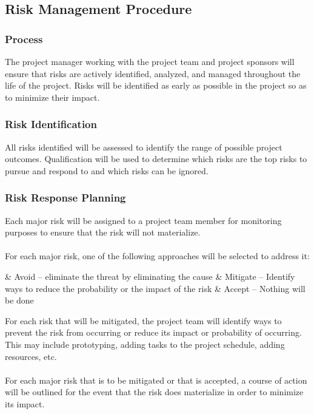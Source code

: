 \documentclass[a4paper]{article}
\begin{document}
    \subsection{Risk Management Procedure}
    
    \subsubsection{Process}
    The project manager working with the project team and project sponsors will ensure that risks are actively identified, analyzed, and managed throughout the life of the project.  Risks will be identified as early as possible in the project so as to minimize their impact. 
    
    \subsubsection{Risk Identification}
    All risks identified will be assessed to identify the range of possible project outcomes.  Qualification will be used to determine which risks are the top risks to pursue and respond to and which risks can be ignored.
    
    \subsubsection{Risk Response Planning}
    Each major risk will be assigned to a project team member for monitoring purposes to ensure that the risk will not materialize. \\ \\
    For each major risk, one of the following approaches will be selected to address it:
    \begin{easylist}
    	& \thinspace Avoid – eliminate the threat by eliminating the cause
    	& \thinspace  Mitigate – Identify ways to reduce the probability or the impact of the risk
    	& \thinspace Accept – Nothing will be done
    \end{easylist}\par
    \bigskip
    \noindent
    For each risk that will be mitigated, the project team will identify ways to prevent the risk from occurring or reduce its impact or probability of occurring.  This may include prototyping, adding tasks to the project schedule, adding resources, etc.\\ \\
    For each major risk that is to be mitigated or that is accepted, a course of action will be outlined for the event that the risk does materialize in order to minimize its impact.
    
\end{document}

